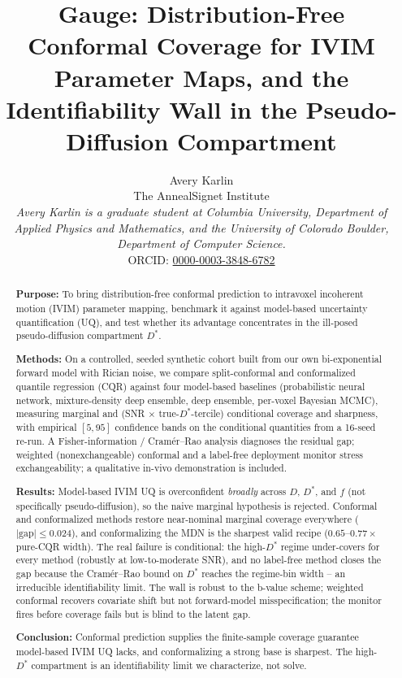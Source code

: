 \documentclass[11pt]{article}
\title{\textbf{Gauge: Distribution-Free Conformal Coverage for IVIM Parameter
Maps, and the Identifiability Wall in the Pseudo-Diffusion Compartment}}
\author{Avery Karlin\\[2pt]
\small The AnnealSignet Institute\\[2pt]
\small \textit{Avery Karlin is a graduate student at Columbia University, Department
of Applied Physics and Mathematics, and the University of Colorado Boulder,
Department of Computer Science.}\\[2pt]
\small ORCID: \href{https://orcid.org/0000-0003-3848-6782}{0000-0003-3848-6782}}
\date{}
\newcommand{\Dstar}{D^{*}}
\begin{document}
\maketitle

\begin{abstract}
\noindent
\textbf{Purpose:} To bring distribution-free conformal prediction to intravoxel
incoherent motion (IVIM) parameter mapping, benchmark it against model-based
uncertainty quantification (UQ), and test whether its advantage concentrates in
the ill-posed pseudo-diffusion compartment $\Dstar$.

\noindent
\textbf{Methods:} On a controlled, seeded synthetic cohort built from our own
bi-exponential forward model with Rician noise, we compare split-conformal and
conformalized quantile regression (CQR) against four model-based baselines
(probabilistic neural network, mixture-density deep ensemble, deep ensemble,
per-voxel Bayesian MCMC), measuring marginal and (SNR $\times$
true-$\Dstar$-tercile) conditional coverage and sharpness, with empirical
$[5,95]$ confidence bands on the conditional quantities from a 16-seed re-run. A
Fisher-information / Cram\'er--Rao analysis diagnoses the residual gap; weighted
(nonexchangeable) conformal and a label-free deployment monitor stress
exchangeability; a qualitative in-vivo demonstration is included.

\noindent
\textbf{Results:} Model-based IVIM UQ is overconfident \emph{broadly} across $D$,
$\Dstar$, and $f$ (not specifically pseudo-diffusion), so the naive marginal
hypothesis is rejected. Conformal and conformalized methods restore near-nominal
marginal coverage everywhere ($|\text{gap}|\le 0.024$), and conformalizing the MDN
is the sharpest valid recipe ($0.65$--$0.77\times$ pure-CQR width). The real
failure is conditional: the high-$\Dstar$ regime under-covers for every method
(robustly at low-to-moderate SNR), and no label-free method closes the gap because the Cram\'er--Rao bound
on $\Dstar$ reaches the regime-bin width -- an irreducible identifiability limit.
The wall is robust to the b-value scheme; weighted conformal recovers covariate
shift but not forward-model misspecification; the monitor fires before coverage
fails but is blind to the latent gap.

\noindent
\textbf{Conclusion:} Conformal prediction supplies the finite-sample coverage
guarantee model-based IVIM UQ lacks, and conformalizing a strong base is sharpest.
The high-$\Dstar$ compartment is an identifiability limit we characterize, not
solve.
\end{abstract}
\end{document}
